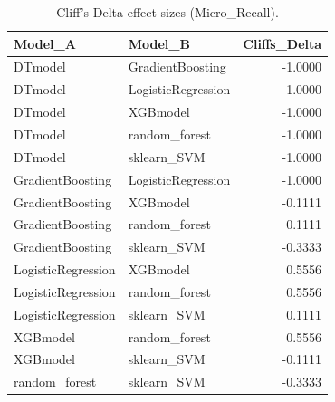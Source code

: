 \begin{table}[t]
\centering
\begin{tabular}{llr}
\toprule
Model_A & Model_B & Cliffs_Delta \\
\midrule
DTmodel & GradientBoosting & -1.0000 \\
DTmodel & LogisticRegression & -1.0000 \\
DTmodel & XGBmodel & -1.0000 \\
DTmodel & random_forest & -1.0000 \\
DTmodel & sklearn_SVM & -1.0000 \\
GradientBoosting & LogisticRegression & -1.0000 \\
GradientBoosting & XGBmodel & -0.1111 \\
GradientBoosting & random_forest & 0.1111 \\
GradientBoosting & sklearn_SVM & -0.3333 \\
LogisticRegression & XGBmodel & 0.5556 \\
LogisticRegression & random_forest & 0.5556 \\
LogisticRegression & sklearn_SVM & 0.1111 \\
XGBmodel & random_forest & 0.5556 \\
XGBmodel & sklearn_SVM & -0.1111 \\
random_forest & sklearn_SVM & -0.3333 \\
\bottomrule
\end{tabular}
\caption{Cliff's Delta effect sizes (Micro_Recall).}
\label{tab:cliffs_Micro_Recall}
\end{table}